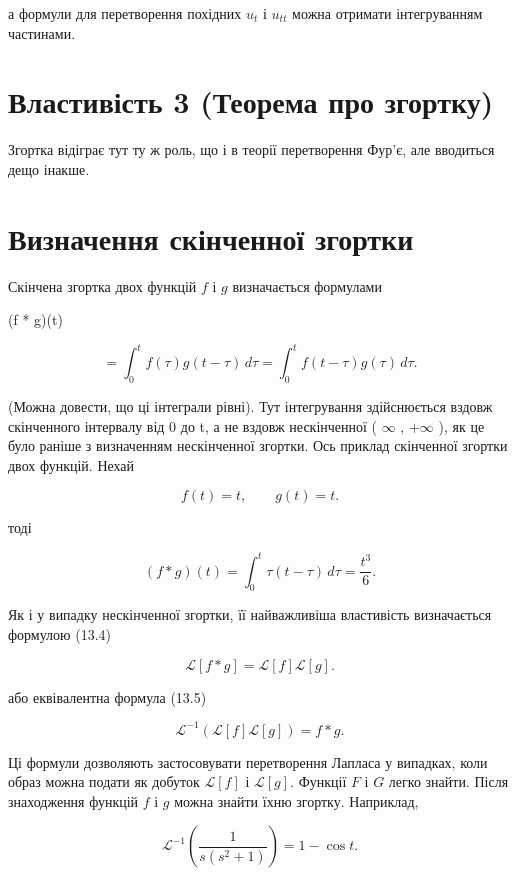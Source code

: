 \documentclass[
  ukrainian,
]{article}
\begin{document}
а формули для перетворення похідних \(u_t\) і \(u_{tt}\) можна отримати
інтегруванням частинами.

\section{Властивість 3 (Теорема про
згортку)}\label{ux432ux43bux430ux441ux442ux438ux432ux456ux441ux442ux44c-3-ux442ux435ux43eux440ux435ux43cux430-ux43fux440ux43e-ux437ux433ux43eux440ux442ux43aux443}

Згортка відіграє тут ту ж роль, що і в теорії перетворення Фур'є, але
вводиться дещо інакше.

\section{Визначення скінченної
згортки}\label{ux432ux438ux437ux43dux430ux447ux435ux43dux43dux44f-ux441ux43aux456ux43dux447ux435ux43dux43dux43eux457-ux437ux433ux43eux440ux442ux43aux438}

Скінчена згортка двох функцій \(f\) і \(g\) визначається формулами

(f * g)(t)

\[
= \int_0^t f(\tau)g(t-\tau)\,d\tau
= \int_0^t f(t-\tau)g(\tau)\,d\tau.
\]

(Можна довести, що ці інтеграли рівні). Тут інтегрування здійснюється
вздовж скінченного інтервалу від 0 до t, а не вздовж нескінченної (
\(\infty\) , \(+\infty\) ), як це було раніше з визначенням нескінченної
згортки. Ось приклад скінченної згортки двох функцій. Нехай

\[
f(t)=t,\qquad g(t)=t.
\]

тоді

\[
(f * g)(t)=\int_0^t \tau(t-\tau)\,d\tau=\frac{t^3}{6}.
\]

Як і у випадку нескінченної згортки, її найважливіша властивість
визначається формулою (13.4)

\[
\mathcal{L}[f*g]=\mathcal{L}[f]\mathcal{L}[g].
\]

або еквівалентна формула (13.5)

\[
\mathcal{L}^{-1}\!\left(\mathcal{L}[f]\mathcal{L}[g]\right)=f*g.
\]

Ці формули дозволяють застосовувати перетворення Лапласа у випадках,
коли образ можна подати як добуток \(\mathcal{L}[f]\) і
\(\mathcal{L}[g]\). Функції \(F\) і \(G\) легко знайти. Після
знаходження функцій \(f\) і \(g\) можна знайти їхню згортку. Наприклад,

\[
\mathcal{L}^{-1}\!\left(\frac{1}{s(s^2+1)}\right)=1-\cos t.
\]
\end{document}

